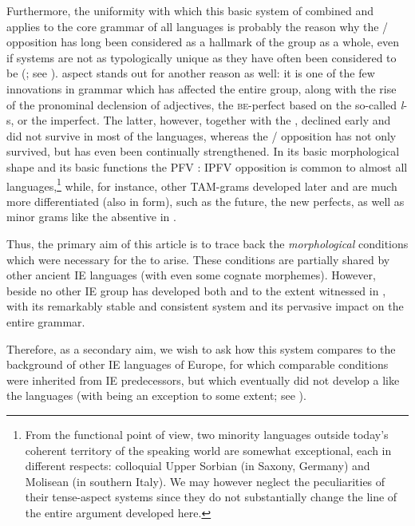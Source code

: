 \documentclass[output=paper]{langsci/langscibook}
\begin{document}
Furthermore, the uniformity with which this basic system of combined  and  applies to the core grammar of all  languages is probably the reason why the / opposition has long been considered as a hallmark of the  group as a whole, even if  systems are not as typologically unique as they have often been considered to be (\citealt{ArkadievShluinsky2015}; see ).  aspect stands out for another reason as well: it is one of the few innovations in grammar which has affected the entire group, along with the rise of the pronominal declension of adjectives, the \textsc{be}-perfect based on the so-called \textit{l}-s, or the imperfect. The latter, however, together with the , declined early and did not survive in most of the  languages, whereas the / opposition has not only survived, but has even been continually strengthened. In its basic morphological shape and its basic functions the PFV : IPFV opposition is common to almost all  languages,\footnote{From the functional point of view, two  minority languages outside today’s coherent territory of the  speaking world are somewhat exceptional, each in different respects: colloquial Upper Sorbian (in Saxony, Germany) and Molisean  (in southern Italy). We may however neglect the peculiarities of their tense-aspect systems since they do not substantially change the line of the entire argument developed here.} while, for instance, other TAM-grams developed later and are much more differentiated (also in form), such as the future, the new perfects, as well as minor grams like the absentive in .

Thus, the primary aim of this article is to trace back the \textit{morphological} conditions which were necessary for the   to arise. These conditions are partially shared by other ancient IE languages (with even some cognate morphemes). However, beside  no other IE group has developed both  and  to the extent witnessed in , with its remarkably stable and consistent system and its pervasive impact on the entire grammar. 

Therefore, as a secondary aim, we wish to ask how this system compares to the background of other IE languages of Europe, for which comparable conditions were inherited from IE predecessors, but which eventually did not develop a  like the  languages (with  being an exception to some extent; see ). 
\end{document}
